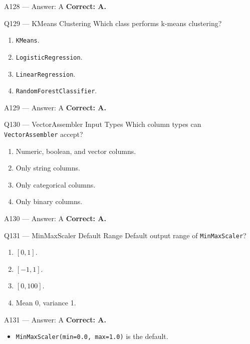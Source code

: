 \documentclass[aspectratio=169,9pt]{beamer}
\begin{document}
	\begin{frame}{A128 --- Answer: A}
		\textbf{Correct: A.}
	\end{frame}
	
	\begin{frame}{Q129 --- KMeans Clustering}
		Which class performs k-means clustering?
		\begin{enumerate}[label=\Alph*.]
			\item \texttt{KMeans}.
			\item \texttt{LogisticRegression}.
			\item \texttt{LinearRegression}.
			\item \texttt{RandomForestClassifier}.
		\end{enumerate}
	\end{frame}
	
	\begin{frame}{A129 --- Answer: A}
		\textbf{Correct: A.}
	\end{frame}
	
	\begin{frame}{Q130 --- VectorAssembler Input Types}
		Which column types can \texttt{VectorAssembler} accept?
		\begin{enumerate}[label=\Alph*.]
			\item Numeric, boolean, and vector columns.
			\item Only string columns.
			\item Only categorical columns.
			\item Only binary columns.
		\end{enumerate}
	\end{frame}
	
	\begin{frame}{A130 --- Answer: A}
		\textbf{Correct: A.}
	\end{frame}
	
	\begin{frame}{Q131 --- MinMaxScaler Default Range}
		Default output range of \texttt{MinMaxScaler}?
		\begin{enumerate}[label=\Alph*.]
			\item $[0,1]$.
			\item $[-1,1]$.
			\item $[0,100]$.
			\item Mean 0, variance 1.
		\end{enumerate}
	\end{frame}
	
	\begin{frame}{A131 --- Answer: A}
		\textbf{Correct: A.}
		\begin{itemize}
			\item \texttt{MinMaxScaler(min=0.0, max=1.0)} is the default.
		\end{itemize}
	\end{frame}
	
\end{document}
